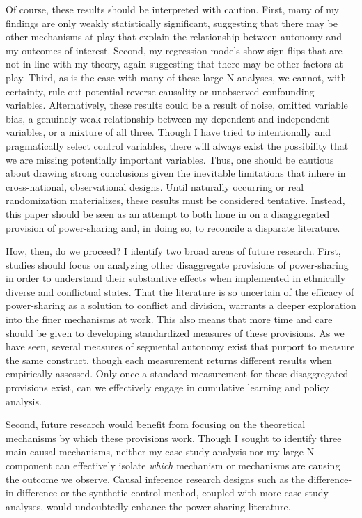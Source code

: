 \documentclass[12pt]{article}
\begin{document}
Of course, these results should be interpreted with caution. First, many of my findings are only weakly statistically significant, suggesting that there may be other mechanisms at play that explain the relationship between autonomy and my outcomes of interest. Second, my regression models show sign-flips that are not in line with my theory, again suggesting that there may be other factors at play. Third, as is the case with many of these large-N analyses, we cannot, with certainty, rule out potential reverse causality or unobserved confounding variables. Alternatively, these results could be a result of noise, omitted variable bias, a genuinely weak relationship between my dependent and independent variables, or a mixture of all three. Though I have tried to intentionally and pragmatically select control variables, there will always exist the possibility that we are missing potentially important variables. Thus, one should be cautious about drawing strong conclusions given the inevitable limitations that inhere in cross-national, observational designs. Until naturally occurring or real randomization materializes, these results must be considered tentative. Instead, this paper should be seen as an attempt to both hone in on a disaggregated provision of power-sharing and, in doing so, to reconcile a disparate literature.

How, then, do we proceed? I identify two broad areas of future research. First, studies should focus on analyzing other disaggregate provisions of power-sharing in order to understand their substantive effects when implemented in ethnically diverse and conflictual states. That the literature is so uncertain of the efficacy of power-sharing as a solution to conflict and division, warrants a deeper exploration into the finer mechanisms at work. This also means that more time and care should be given to developing standardized measures of these provisions. As we have seen, several measures of segmental autonomy exist that purport to measure the same construct, though each measurement returns different results when empirically assessed. Only once a standard measurement for these disaggregated provisions exist, can we effectively engage in cumulative learning and policy analysis.  

Second, future research would benefit from focusing on the theoretical mechanisms by which these provisions work. Though I sought to identify three main causal mechanisms, neither my case study analysis nor my large-N component can effectively isolate \textit{which} mechanism or mechanisms are causing the outcome we observe. Causal inference research designs such as the difference-in-difference or the synthetic control method, coupled with more case study analyses, would undoubtedly enhance the power-sharing literature.
\end{document}
